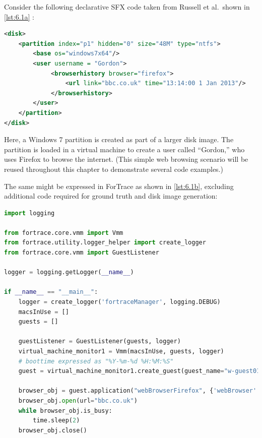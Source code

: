 \documentclass[letterpaper,12pt]{report}
\begin{document}
Consider the following declarative SFX code taken from Russell et
al.~shown in \autoref{lst:6.1a}
\cite{russellForensicImageDescription2012}:

\begin{lstlisting}[label={lst:6.1a}, caption={Declarative SFX scenario with web browsing}, language=XML]
<disk>
    <partition index="p1" hidden="0" size="48M" type="ntfs">
        <base os="windows7x64"/>
        <user username = "Gordon">
             <browserhistory browser="firefox">
                 <url link="bbc.co.uk" time="13:14:00 1 Jan 2013"/>
             </browserhistory>
        </user>
    </partition>
</disk>
\end{lstlisting}

Here, a Windows 7 partition is created as part of a larger disk image.
The partition is loaded in a virtual machine to create a user called
``Gordon,'' who uses Firefox to browse the internet. (This simple web
browsing scenario will be reused throughout this chapter to demonstrate
several code examples.)

The same might be expressed in ForTrace
\cite{gobelForTraceHolisticForensic2022} as shown in
\autoref{lst:6.1b}, excluding additional code required for ground truth
and disk image generation:

\begin{lstlisting}[label={lst:6.1b}, caption={Imperative ForTrace scenario with web browsing \cite{gobelForTraceHolisticForensic2022}}, language=Python]
import logging

from fortrace.core.vmm import Vmm
from fortrace.utility.logger_helper import create_logger
from fortrace.core.vmm import GuestListener

logger = logging.getLogger(__name__)

if __name__ == "__main__":
    logger = create_logger('fortraceManager', logging.DEBUG)
    macsInUse = []
    guests = []
    
    guestListener = GuestListener(guests, logger)
    virtual_machine_monitor1 = Vmm(macsInUse, guests, logger)
    # boottime expressed as "%Y-%m-%d %H:%M:%S"
    guest = virtual_machine_monitor1.create_guest(guest_name="w-guest01", platform="windows", boottime="2013-01-01 13:14:00")

    browser_obj = guest.application("webBrowserFirefox", {'webBrowser': "firefox"})
    browser_obj.open(url="bbc.co.uk")
    while browser_obj.is_busy:
        time.sleep(2)
    browser_obj.close()
\end{lstlisting}
\end{document}
